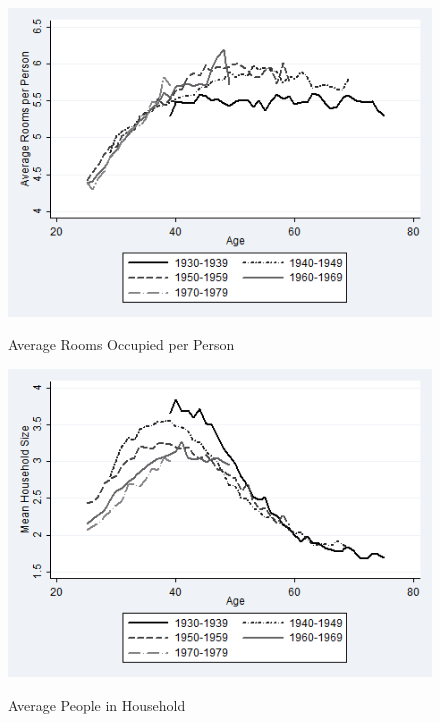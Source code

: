 \begin{figure}
\caption{Average Rooms Occupied per Person}
\centering
\includegraphics[width=.7\linewidth]{pictures/cohort_rooms.png}
\label{fig:cohort_rooms}
\end{figure}

\begin{figure}
\caption{Average People in Household}
\centering
\includegraphics[width=.7\linewidth]{pictures/av_peep.png}
\label{fig:cohort_peeps}
\end{figure}


